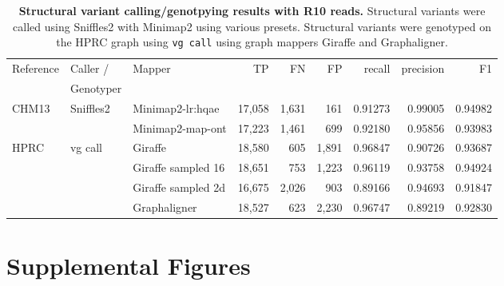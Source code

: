 \documentclass[11pt]{ucscthesis}
\begin{document}
\begin{landscape}
\begin{table}[htb]
    \centering
    \begin{tabular}{|l|l|l|r|r|r|r|r|r|}
        \hline
        Reference   & Caller /       & Mapper                & TP           & FN          & FP        & recall        & precision     & F1 \\
                    & Genotyper   &                       &              &             &           &               &               & \\
        \hline
        CHM13       & Sniffles2     & Minimap2-lr:hqae      & 17,058       & 1,631       & 161       & 0.91273       & 0.99005       & 0.94982 \\
                    &               & Minimap2-map-ont      & 17,223       & 1,461       & 699       & 0.92180       & 0.95856       & 0.93983 \\
        HPRC        & vg call       & Giraffe               & 18,580       & 605         & 1,891     & 0.96847       & 0.90726       & 0.93687 \\
                    &               & Giraffe sampled 16    & 18,651       & 753         & 1,223     & 0.96119       & 0.93758       & 0.94924 \\
                    &               & Giraffe sampled 2d    & 16,675       & 2,026       & 903       & 0.89166       & 0.94693       & 0.91847 \\
                    &               & Graphaligner          & 18,527       & 623         & 2,230     & 0.96747       & 0.89219       & 0.92830 \\ 
        \hline
    \end{tabular}
    \caption[SV R10 results]{\textbf{Structural variant calling/genotpying results with R10 reads.} Structural variants were called using Sniffles2 with Minimap2 using various presets. Structural variants were genotyped on the HPRC graph using \texttt{vg call} using graph mappers Giraffe and Graphaligner.}
    \label{tab:sv_r10}
\end{table}
\end{landscape}

\section{Supplemental Figures}
\end{document}

